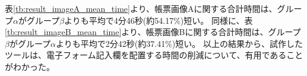 表\ref{tb:result_imageA_mean_time}より、帳票画像Aに関する合計時間は、グループ$\alpha$がグループ$\beta$よりも平均で4分46秒(約54.17\%)短い。
同様に、表\ref{tb:result_imageB_mean_time}より、帳票画像Bに関する合計時間は、グループ$\beta$がグループ$\alpha$よりも平均で2分42秒(約37.41\%)短い。
以上の結果から、試作したツールは、電子フォーム記入欄を配置する時間の削減について、有用であることがわかった。








